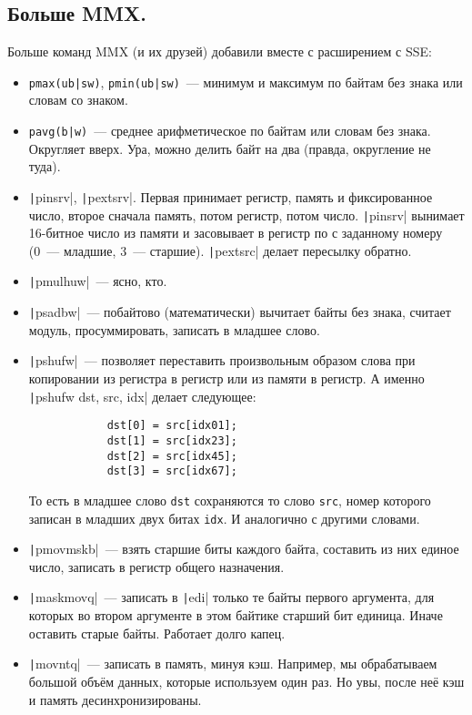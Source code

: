 \documentclass{article}
\begin{document}
    \subsection{Больше MMX.}
    Больше команд MMX (и их друзей) добавили вместе с расширением с SSE:
    \begin{itemize}
        \item \Verb/pmax(ub|sw)/, \Verb/pmin(ub|sw)/~--- минимум и максимум по байтам без знака или словам со знаком.
        \item \Verb/pavg(b|w)/~--- среднее арифметическое по байтам или словам без знака. Округляет вверх. Ура, можно делить байт на два (правда, округление не туда).
        \item \texttt|pinsrv|, \texttt|pextsrv|. Первая принимает регистр, память и фиксированное число, второе сначала память, потом регистр, потом число. \texttt|pinsrv| вынимает 16-битное число из памяти и засовывает в регистр по с заданному номеру (0~--- младшие, 3~--- старшие). \texttt|pextsrc| делает пересылку обратно.
        \item \texttt|pmulhuw|~--- ясно, кто.
        \item \texttt|psadbw|~--- побайтово (математически) вычитает байты без знака, считает модуль, просуммировать, записать в младшее слово.
        \item \texttt|pshufw|~--- позволяет переставить произвольным образом слова при копировании из регистра в регистр или из памяти в регистр. А именно \texttt|pshufw dst, src, idx| делает следующее:
        \begin{verbatim}
            dst[0] = src[idx01];
            dst[1] = src[idx23];
            dst[2] = src[idx45];
            dst[3] = src[idx67];
        \end{verbatim}
        То есть в младшее слово \Verb|dst| сохраняются то слово \Verb|src|, номер которого записан в младших двух битах \Verb|idx|. И аналогично с другими словами.
        \item \texttt|pmovmskb|~--- взять старшие биты каждого байта, составить из них единое число, записать в регистр общего назначения.
        \item \texttt|maskmovq|~--- записать в \texttt|edi| только те байты первого аргумента, для которых во втором аргументе в этом байтике старший бит единица. Иначе оставить старые байты. Работает долго капец.
        \item \texttt|movntq|~--- записать в память, минуя кэш. Например, мы обрабатываем большой объём данных, которые используем один раз. Но увы, после неё кэш и память десинхронизированы.

\end{itemize}
\end{document}
